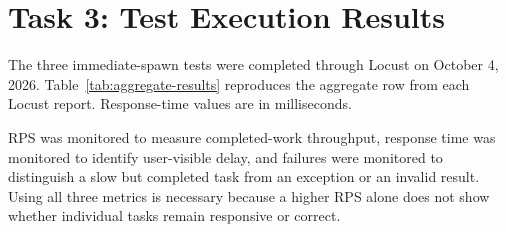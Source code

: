 \documentclass[11pt]{article}
\begin{document}
\section{Task 3: Test Execution Results}

The three immediate-spawn tests were completed through Locust on October 4, 2026. Table~\ref{tab:aggregate-results} reproduces the aggregate row from each Locust report. Response-time values are in milliseconds.

RPS was monitored to measure completed-work throughput, response time was monitored to identify user-visible delay, and failures were monitored to distinguish a slow but completed task from an exception or an invalid result. Using all three metrics is necessary because a higher RPS alone does not show whether individual tasks remain responsive or correct.

\begin{table}[H]
\centering
\caption{Aggregate Locust results for the three baseline tests.}
\label{tab:aggregate-results}
\end{table}
\end{document}
